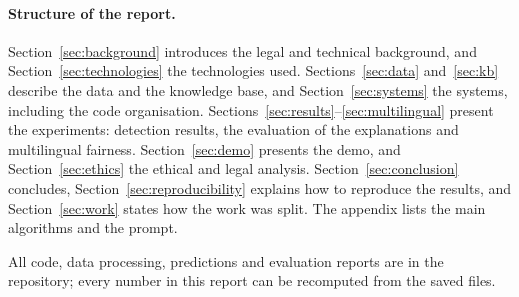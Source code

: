 \paragraph{Structure of the report.} Section~\ref{sec:background} introduces the legal and technical background, and Section~\ref{sec:technologies} the technologies used. Sections~\ref{sec:data} and~\ref{sec:kb} describe the data and the knowledge base, and Section~\ref{sec:systems} the systems, including the code organisation. Sections~\ref{sec:results}--\ref{sec:multilingual} present the experiments: detection results, the evaluation of the explanations and multilingual fairness. Section~\ref{sec:demo} presents the demo, and Section~\ref{sec:ethics} the ethical and legal analysis. Section~\ref{sec:conclusion} concludes, Section~\ref{sec:reproducibility} explains how to reproduce the results, and Section~\ref{sec:work} states how the work was split. The appendix lists the main algorithms and the prompt.

All code, data processing, predictions and evaluation reports are in the repository; every number in this report can be recomputed from the saved files.
